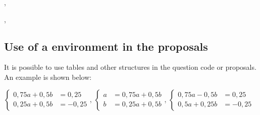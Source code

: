 \begin{tkzexample}[vbox]
\begin{alterqcm}[lq=8cm,numprop=true,sep]
{{\hspace{1cm}  \begin{minipage}{5cm}  \end{minipage}},
{\hspace{1cm}  \begin{minipage}{5cm}  \end{minipage}},
{\hspace{1cm}  \begin{minipage}{5cm}  \end{minipage} }}
\end{alterqcm} 
\end{tkzexample}

\subsection{Use of a  environment in the proposals} 

It is possible to use tables and other structures in the question code or proposals. An example is shown below:

\medskip


\begin{tkzexample}[vbox]
\begin{alterqcm}[lq=88mm,symb=$\Box$]
{%
{$ \left\lbrace
\begin{array}{ll}
 0,75a + 0,5b &= 0,25 \\
 0,25a + 0,5b &=-0,25
\end{array}\right.$},
{$ \left\{
\begin{array}{ll}
 a &=  0,75a +0,5b \\
 b &=  0,25a +0,5b
\end{array}\right.$},
{$ \left\lbrace
\begin{array}{ll}
 0,75a - 0,5b &= 0,25 \\
 0,5a + 0,25b &=-0,25
\end{array}\right.$}
}
\end{alterqcm}\end{tkzexample}  


